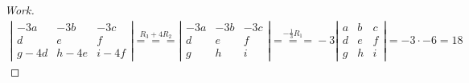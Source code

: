 \documentclass{article}
\begin{document}
\begin{proof}[Work]
  \begin{align*}
    \left\lvert\begin{array}{ccc}
                 -3a    & -3b    & -3c    \\
                 d      & e      & f      \\
                 g - 4d & h - 4e & i - 4f
               \end{array} \right\rvert \overset{R_3 + 4R_2}{===}
    \left\lvert\begin{array}{ccc}
                 -3a & -3b & -3c \\
                 d   & e   & f   \\
                 g   & h   & i
               \end{array} \right\rvert \overset{-\frac{1}{3}R_1}{===} -3
    \left\lvert\begin{array}{ccc}
                 a & b & c \\
                 d & e & f \\
                 g & h & i
               \end{array} \right\rvert = -3 \cdot -6 = 18
  \end{align*}
\end{proof}
\qdash
\end{document}
